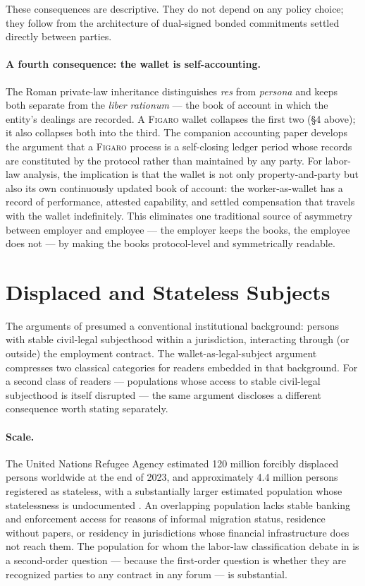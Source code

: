 \documentclass[11pt,a4paper]{article}
\theoremstyle{remark}
\newcommand{\figaro}{\textsc{Figaro}}
\begin{document}
These consequences are descriptive. They do not depend on any
policy choice; they follow from the architecture of dual-signed
bonded commitments settled directly between parties.

\paragraph{A fourth consequence: the wallet is self-accounting.}
The Roman private-law inheritance distinguishes \emph{res}
from \emph{persona} and keeps both separate from the
\emph{liber rationum} --- the book of account in which the
entity's dealings are recorded. A \figaro{} wallet collapses
the first two (§4 above); it also collapses both into the
third. The companion accounting
paper develops the argument
that a \figaro{} process is a self-closing ledger period
whose records are constituted by the protocol rather than
maintained by any party. For labor-law analysis, the
implication is that the wallet is not only property-and-party
but also its own continuously updated book of account: the
worker-as-wallet has a record of performance, attested
capability, and settled compensation that travels with the
wallet indefinitely. This eliminates one traditional source
of asymmetry between employer and employee --- the employer
keeps the books, the employee does not --- by making the
books protocol-level and symmetrically readable.

\section{Displaced and Stateless Subjects}
\label{sec:displaced}

The arguments of  presumed a conventional
institutional background: persons with stable civil-legal
subjecthood within a jurisdiction, interacting through (or
outside) the employment contract. The wallet-as-legal-subject
argument compresses two classical categories for readers
embedded in that background. For a second class of readers ---
populations whose access to stable civil-legal subjecthood is
itself disrupted --- the same argument discloses a different
consequence worth stating separately.

\paragraph{Scale.}
The United Nations Refugee Agency estimated 120 million forcibly
displaced persons worldwide at the end of 2023, and approximately
4.4 million persons registered as stateless, with a substantially
larger estimated population whose statelessness is undocumented
\citep{unhcr2024globaltrends}. An overlapping population lacks
stable banking and enforcement access for reasons of informal
migration status, residence without papers, or residency in
jurisdictions whose financial infrastructure does not reach
them. The population for whom the labor-law classification debate
in  is a second-order question --- because
the first-order question is whether they are recognized parties to
any contract in any forum --- is substantial.
\end{document}
